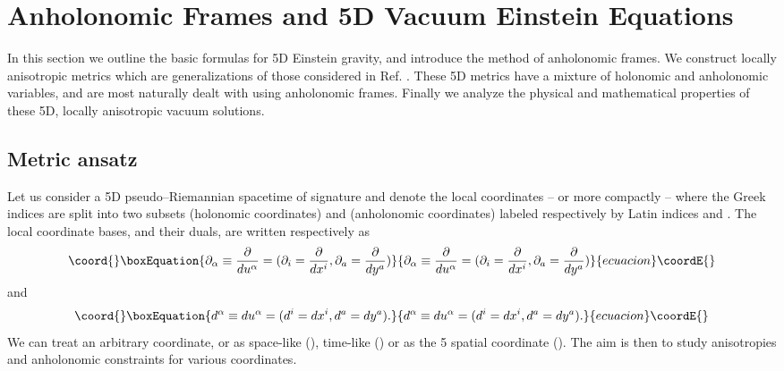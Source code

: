 \documentclass[a4paper,preprint,prabib,aps]{revtex4}
\begin{document}
\section{Anholonomic Frames and 5D Vacuum Einstein Equations}

In this section we outline the basic formulas for 5D Einstein gravity, and
introduce the method of anholonomic frames. We construct locally anisotropic
metrics which are generalizations of those considered in Ref. \cite{vsbd}.
These 5D metrics have a mixture of holonomic and anholonomic variables, and
are most naturally dealt with using anholonomic frames. Finally we analyze
the physical and mathematical properties of these 5D, locally anisotropic
vacuum solutions.

\subsection{Metric ansatz}

Let us consider a 5D pseudo--Riemannian spacetime of signature \myHighlight{$(+,-,-,-,-)$}\coordHE{}
and denote the local coordinates \coordHE{} -- or more compactly \coordHE{} --
where the Greek indices are split into two subsets \coordHE{} (holonomic
coordinates) and \coordHE{} (anholonomic coordinates) labeled respectively by
Latin indices \coordHE{} and \coordHE{}. The local coordinate
bases, \coordHE{} and their duals, \coordHE{} are written respectively as
\begin{equation}\coord{}\boxEquation{
\partial _\alpha \equiv \frac \partial {du^\alpha }=(\partial _i=\frac 
\partial {dx^i},\partial _a=\frac \partial {dy^a})  \label{pder}
}{
\partial _\alpha \equiv \frac \partial {du^\alpha }=(\partial _i=\frac 
\partial {dx^i},\partial _a=\frac \partial {dy^a})  }{ecuacion}\coordE{}\end{equation}
and
\begin{equation}\coord{}\boxEquation{
d^\alpha \equiv du^\alpha =(d^i=dx^i,d^a=dy^a).  \label{pdif}
}{
d^\alpha \equiv du^\alpha =(d^i=dx^i,d^a=dy^a).  }{ecuacion}\coordE{}\end{equation}
We can treat an arbitrary coordinate, \coordHE{} or \coordHE{} as space-like (\coordHE{}), time-like (\coordHE{}) or as the 5\coordHE{} spatial coordinate (\myHighlight{$\chi$}\coordHE{}). The aim
is then to study anisotropies and anholonomic constraints for various
coordinates.
\end{document}
